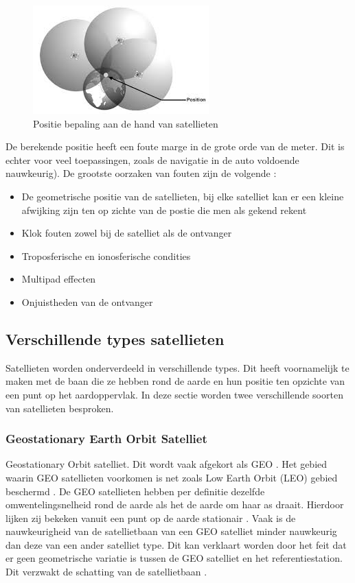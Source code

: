 \begin{figure}[hpb]
	\includegraphics[scale=1.75]{BepalingPositie.jpg}
	\caption{Positie bepaling aan de hand van satellieten \cite{LBibSat}}
	\label{imgPbS}
\end{figure} 

De berekende positie heeft een foute marge in de grote orde van de meter. Dit is echter voor veel toepassingen, zoals de navigatie in de auto voldoende nauwkeurig). De grootste oorzaken van fouten zijn de volgende \cite{LBibGNSS8}:
\begin{itemize}
	\item De geometrische positie van de satellieten, bij elke satelliet kan er een kleine afwijking zijn ten op zichte van de postie die men als gekend rekent
	\item Klok fouten zowel bij de satelliet als de ontvanger
	\item Troposferische en ionosferische condities
	\item Multipad effecten
	\item Onjuistheden van de ontvanger
\end{itemize}

\subsection{Verschillende types satellieten}
\label{LVTS}
Satellieten worden onderverdeeld in verschillende types. Dit heeft voornamelijk te maken met de baan die ze hebben rond de aarde en hun positie ten opzichte van een punt op het aardoppervlak. In deze sectie worden twee verschillende soorten van satellieten besproken. 

\subsubsection{Geostationary Earth Orbit Satelliet}
Geostationary Orbit satelliet. Dit wordt vaak afgekort als GEO \cite{LBibGEO,LBibMEO}. Het gebied waarin GEO satellieten voorkomen is net zoals Low Earth Orbit (LEO) gebied beschermd \cite{LBibMEO}. De GEO satellieten hebben per definitie dezelfde omwentelingsnelheid rond de aarde als het de aarde om haar as draait. Hierdoor lijken zij bekeken vanuit een punt op de aarde stationair \cite{LBibGEO}.  Vaak is de nauwkeurigheid van de satellietbaan van een GEO satelliet minder nauwkeurig dan deze van een ander satelliet type. Dit kan verklaart worden door het feit dat er geen geometrische variatie is tussen de GEO satelliet en het referentiestation. Dit verzwakt de schatting van de satellietbaan \cite{LBibPPP2}.
 
